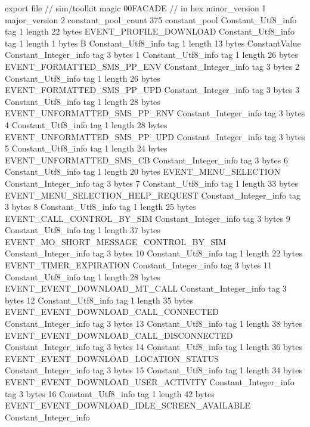 export file {		// sim/toolkit
	magic	00FACADE		 // in hex
	minor_version	1
	major_version	2
	constant_pool_count	375
	constant_pool {
		Constant_Utf8_info {
			tag	1
			length	22
			bytes	EVENT_PROFILE_DOWNLOAD
		}
		Constant_Utf8_info {
			tag	1
			length	1
			bytes	B
		}
		Constant_Utf8_info {
			tag	1
			length	13
			bytes	ConstantValue
		}
		Constant_Integer_info {
			tag	3
			bytes	1
		}
		Constant_Utf8_info {
			tag	1
			length	26
			bytes	EVENT_FORMATTED_SMS_PP_ENV
		}
		Constant_Integer_info {
			tag	3
			bytes	2
		}
		Constant_Utf8_info {
			tag	1
			length	26
			bytes	EVENT_FORMATTED_SMS_PP_UPD
		}
		Constant_Integer_info {
			tag	3
			bytes	3
		}
		Constant_Utf8_info {
			tag	1
			length	28
			bytes	EVENT_UNFORMATTED_SMS_PP_ENV
		}
		Constant_Integer_info {
			tag	3
			bytes	4
		}
		Constant_Utf8_info {
			tag	1
			length	28
			bytes	EVENT_UNFORMATTED_SMS_PP_UPD
		}
		Constant_Integer_info {
			tag	3
			bytes	5
		}
		Constant_Utf8_info {
			tag	1
			length	24
			bytes	EVENT_UNFORMATTED_SMS_CB
		}
		Constant_Integer_info {
			tag	3
			bytes	6
		}
		Constant_Utf8_info {
			tag	1
			length	20
			bytes	EVENT_MENU_SELECTION
		}
		Constant_Integer_info {
			tag	3
			bytes	7
		}
		Constant_Utf8_info {
			tag	1
			length	33
			bytes	EVENT_MENU_SELECTION_HELP_REQUEST
		}
		Constant_Integer_info {
			tag	3
			bytes	8
		}
		Constant_Utf8_info {
			tag	1
			length	25
			bytes	EVENT_CALL_CONTROL_BY_SIM
		}
		Constant_Integer_info {
			tag	3
			bytes	9
		}
		Constant_Utf8_info {
			tag	1
			length	37
			bytes	EVENT_MO_SHORT_MESSAGE_CONTROL_BY_SIM
		}
		Constant_Integer_info {
			tag	3
			bytes	10
		}
		Constant_Utf8_info {
			tag	1
			length	22
			bytes	EVENT_TIMER_EXPIRATION
		}
		Constant_Integer_info {
			tag	3
			bytes	11
		}
		Constant_Utf8_info {
			tag	1
			length	28
			bytes	EVENT_EVENT_DOWNLOAD_MT_CALL
		}
		Constant_Integer_info {
			tag	3
			bytes	12
		}
		Constant_Utf8_info {
			tag	1
			length	35
			bytes	EVENT_EVENT_DOWNLOAD_CALL_CONNECTED
		}
		Constant_Integer_info {
			tag	3
			bytes	13
		}
		Constant_Utf8_info {
			tag	1
			length	38
			bytes	EVENT_EVENT_DOWNLOAD_CALL_DISCONNECTED
		}
		Constant_Integer_info {
			tag	3
			bytes	14
		}
		Constant_Utf8_info {
			tag	1
			length	36
			bytes	EVENT_EVENT_DOWNLOAD_LOCATION_STATUS
		}
		Constant_Integer_info {
			tag	3
			bytes	15
		}
		Constant_Utf8_info {
			tag	1
			length	34
			bytes	EVENT_EVENT_DOWNLOAD_USER_ACTIVITY
		}
		Constant_Integer_info {
			tag	3
			bytes	16
		}
		Constant_Utf8_info {
			tag	1
			length	42
			bytes	EVENT_EVENT_DOWNLOAD_IDLE_SCREEN_AVAILABLE
		}
		Constant_Integer_info {
}}}
